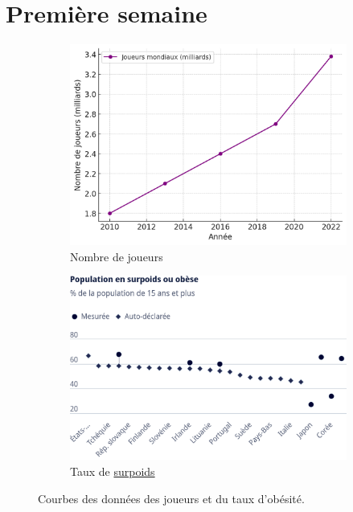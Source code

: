 \section{Première semaine}\label{sec:semaine1}

\begin{figure}[htbp]
    \centering
    \begin{subfigure}[b]{0.45\textwidth}
        \centering
        \includegraphics[width=\textwidth]{images/nombre_joueurs}
        \caption{Nombre de joueurs~\cite{newzoo_gaming_market_2023}}
        \label{fig:nombre-joueurs}
    \end{subfigure}
    \hfill
    \begin{subfigure}[b]{0.45\textwidth}
        \centering
        \includegraphics[width=\textwidth]{images/taux_obesite}
        \caption{Taux de \hyperref[itm:surpoids]{surpoids}~\cite{oecd_obesity_2019}}
        \label{fig:taux-obesite}
    \end{subfigure}
    \caption{Courbes des données des joueurs et du taux d'obésité.}
    \label{fig:courbes-donnees}
\end{figure}